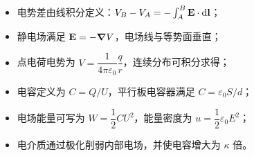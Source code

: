\begin{itemize}
  \item 电势差由线积分定义：$V_B-V_A=-\int_A^B \vb E\cdot \dd\vb l$；
  \item 静电场满足 $\vb E=-\grad V$，电场线与等势面垂直；
  \item 点电荷电势为 $V=\dfrac{1}{4\pi\varepsilon_0}\dfrac{q}{r}$，连续分布可积分求得；
  \item 电容定义为 $C=Q/U$，平行板电容器满足 $C=\varepsilon_0 S/d$；
  \item 电场能量可写为 $W=\dfrac{1}{2}CU^2$，能量密度为 $u=\dfrac{1}{2}\varepsilon_0E^2$；
  \item 电介质通过极化削弱内部电场，并使电容增大为 $\kappa$ 倍。
\end{itemize}

